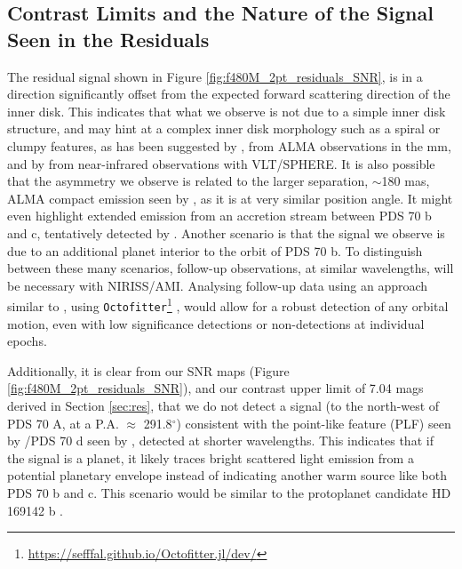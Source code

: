 \documentclass[11pt,twocolumn,twocolappendix]{aastex631}
\begin{document}


\subsection{Contrast Limits and the Nature of the Signal Seen in the Residuals}




The residual signal shown in Figure \ref{fig:f480M_2pt_residuals_SNR}, is in a direction significantly offset from the expected forward scattering direction of the inner disk. This indicates that what we observe is not due to a simple inner disk structure, and may hint at a complex inner disk morphology such as a spiral or clumpy features, as has been suggested by \cite{2022MNRAS.513.5790C}, from ALMA observations in the mm, and by \cite{2019A&A...632A..25M} from near-infrared observations with VLT/SPHERE. {It is also possible that the asymmetry we observe is related to the larger separation, $\sim$180 mas, ALMA compact emission seen by \cite{2023A&A...675A.172B}, as it is at very similar position angle.} {It might even highlight extended emission from an accretion stream between PDS 70 b and c, tentatively detected by \cite{2024arXiv240304855C}.} 
Another scenario is that the signal we observe is due to an additional planet interior to the orbit of PDS 70 b. %
To distinguish between these {many} scenarios, follow-up observations, at similar wavelengths, will be necessary with {NIRISS/AMI.} %
Analysing follow-up data using an approach similar to \cite{2023AJ....165...29T}, using \texttt{Octofitter}\footnote{\url{https://sefffal.github.io/Octofitter.jl/dev/}} \citep{2023AJ....166..164T}, would allow for a robust detection of any orbital motion, even with low {significance} detections or non-detections at individual epochs. 

Additionally, it is clear from our SNR maps (Figure \ref{fig:f480M_2pt_residuals_SNR}), and our contrast upper limit of {7.04} mags derived in Section \ref{sec:res}, that we do not detect a signal (to the north-west of PDS 70 A, at a P.A. $\approx$ 291.8$^{\circ}$) consistent with the point-like feature (PLF) seen by \cite{2019A&A...632A..25M}/PDS 70 d seen by \cite{2024arXiv240304855C}, detected at shorter wavelengths. 
This indicates that if the signal is a planet, it likely traces bright scattered light emission from a potential planetary envelope instead of {indicating another}  warm source like both PDS 70 b and c. This scenario would be similar to the protoplanet candidate HD 169142 b \citep{2023MNRAS.522L..51H}.
\end{document}
